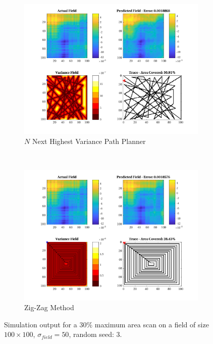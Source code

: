 \begin{figure}[htb!]
\begin{subfigure}[t]{0.5\textwidth}
    \end{subfigure}%
    \\
    \begin{subfigure}[t]{0.5\textwidth}
        \centering
        \includegraphics[width=\linewidth]{figures/hbresults/nnhv_30p_100x100_sf_50_seed_3.png}
        \captionsetup{skip=0.10\baselineskip,size=footnotesize}
        \caption{$N$ Next Highest Variance Path Planner}
    \end{subfigure}%
    ~
    \begin{subfigure}[t]{0.5\textwidth}
        \centering
        \includegraphics[width=\linewidth]{figures/hbresults/zz_30p_100x100_sf_50_seed_3.png}
        \captionsetup{skip=0.10\baselineskip,size=footnotesize}
        \caption{Zig-Zag Method}
    \end{subfigure}%
    \captionsetup{skip=0.20\baselineskip}
    \caption{Simulation output for a $30\%$ maximum area scan on a field of size $100 \times 100$, $\sigma_{field} = 50$, random seed: 3.}
    \label{fig:sim_sigma50_p30_s3}
\end{figure}

